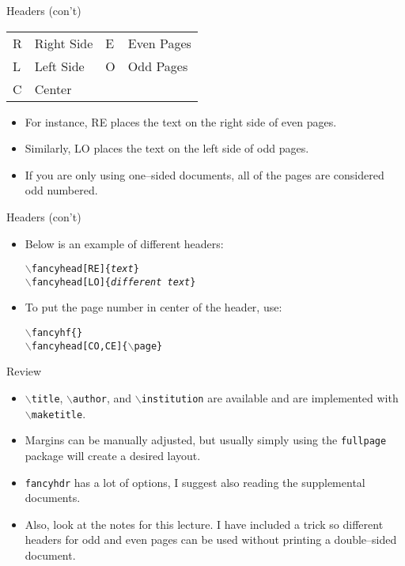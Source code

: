 \documentclass[pdf]{prosper}
\begin{document}
\begin{slide}{Headers (con't)}
	\begin{center}
	\begin{tabular}{l l||l l}
		\hline
		R & Right Side & E & Even Pages \\
		L & Left Side	 & O & Odd Pages \\
		C & Center		 &	 & \\
		\hline
	\end{tabular}
	\end{center}
	\begin{itemize}
		\item For instance, RE places the text on the right side of even pages.
		\item Similarly, LO places the text on the left side of odd pages.
		\item If you are only using one--sided documents, all of the pages are considered odd numbered.
	\end{itemize}
\end{slide}
\begin{slide}{Headers (con't)}
	\begin{itemize}
		\item Below is an example of different headers:
			\begin{center}
				\texttt{$\backslash$fancyhead[RE]\{\textit{text}\}} \\
				\texttt{$\backslash$fancyhead[LO]\{\textit{different text}\}}
			\end{center}
		\item To put the page number in center of the header, use:
			\begin{center}
				\texttt{$\backslash$fancyhf\{\}} \\
				\texttt{$\backslash$fancyhead[CO,CE]\{$\backslash$page\}}
			\end{center}		
	\end{itemize}
\end{slide}
\begin{slide}{Review}
	\begin{itemize}
		\item \texttt{$\backslash$title}, \texttt{$\backslash$author}, and \texttt{$\backslash$institution} are available and are implemented with \texttt{$\backslash$maketitle}.
		\item Margins can be manually adjusted, but usually simply using the \texttt{fullpage} package will create a desired layout.
		\item \texttt{fancyhdr} has a lot of options, I suggest also reading the supplemental documents.
		\item Also, look at the notes for this lecture. I have included a trick so different headers for odd and even pages can be used without printing a double--sided document.
	\end{itemize}
\end{slide}
\end{document}
